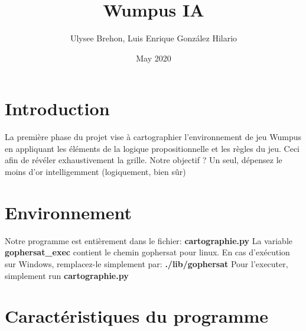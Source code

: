 \documentclass{article}
\title{Wumpus IA}
\author{Ulysee Brehon, Luis Enrique González Hilario}
\date{May 2020}
\begin{document}
\maketitle
\tableofcontents

\section{Introduction}
La première phase du projet vise à cartographier l'environnement de jeu Wumpus en appliquant les éléments de la logique propositionnelle et les règles du jeu. Ceci afin de révéler exhaustivement la grille.
Notre objectif ? Un seul, dépensez le moins d'or intelligemment (logiquement, bien sûr)

\section{Environnement}

Notre programme est entièrement dans le fichier: \textbf{cartographie.py}
\newline \newline
La variable \textbf{gophersat\_exec} contient le chemin gophersat pour linux. En cas d'exécution sur Windows, remplacez-le simplement par: \textbf{./lib/gophersat}
\newline \newline
Pour l'executer, simplement run \textbf{cartographie.py}

\section{Caractéristiques du programme}
\end{document}
